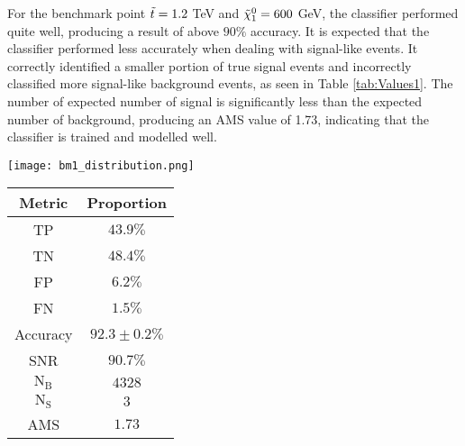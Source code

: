 For the benchmark point $\Tilde{t} = 1.2$ TeV and $\Tilde{\chi}_1^0 = 600$ GeV, the classifier performed quite well, producing a result of above $90\%$ accuracy. It is expected that the classifier performed less accurately when dealing with signal-like events. It correctly identified a smaller portion of true signal events and incorrectly classified more signal-like background events, as seen in Table \ref{tab:Values1}. The number of expected number of signal is significantly less than the expected number of background, producing an AMS value of 1.73, indicating that the classifier is trained and modelled well. \\

\begin{minipage}{\textwidth}
  \begin{minipage}[htbp]{0.65\textwidth}
    \centering
    \texttt{[image: bm1\_distribution.png]}
    \label{fig:dist_bm1}
  \end{minipage}
  \hfill
  \begin{minipage}[htbp]{0.34\textwidth}
        \centering
        \begin{tabular}{c|c} 
        \toprule
        Metric & Proportion \\
        \midrule
        \rowcolor{gray!6} TP & $43.9 \%$ \\
        TN & $48.4 \%$ \\
        \rowcolor{gray!6} FP & $6.2 \%$\\
        FN & $1.5 \%$ \\
        \rowcolor{gray!6} Accuracy & $92.3 \pm 0.2 \%$ \\
        SNR & $90.7 \%$ \\
        \midrule
        \rowcolor{gray!6} $\text{N}_\text{B}$ & $4328$ \\
        $\text{N}_\text{S}$ & $3$ \\
        \rowcolor{gray!6} AMS & $1.73$ \\
        \bottomrule
        \end{tabular}
        \label{tab:Values1}
    \end{minipage}
\end{minipage}

